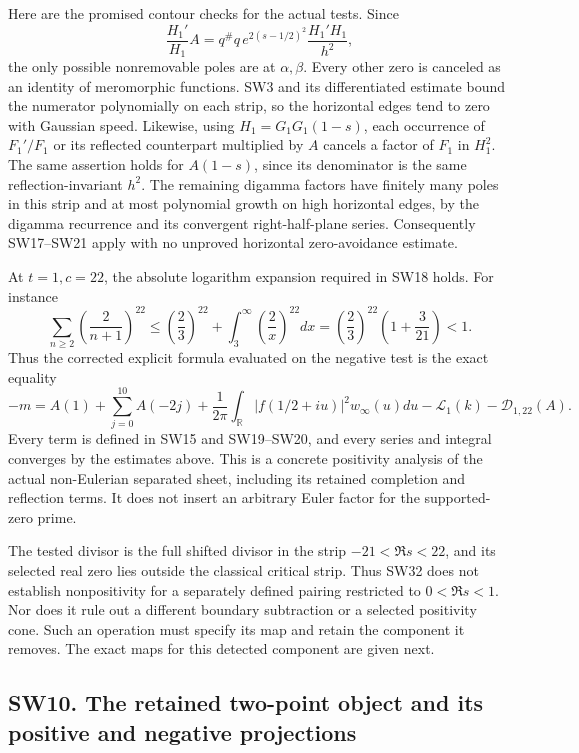 \documentclass[
  10pt,
  a4paper,
]{article}
\begin{document}
Here are the promised contour checks for the actual tests. Since \[
\frac{H_1'}{H_1}A
=q^\#q\,e^{2(s-1/2)^2}\frac{H_1'H_1}{h^2},
\tag{SW34}
\] the only possible nonremovable poles are at \(\alpha,\beta\). Every
other zero is canceled as an identity of meromorphic functions. SW3 and
its differentiated estimate bound the numerator polynomially on each
strip, so the horizontal edges tend to zero with Gaussian speed.
Likewise, using \(H_1=G_1G_1(1-s)\), each occurrence of \(F_1'/F_1\) or
its reflected counterpart multiplied by \(A\) cancels a factor of
\(F_1\) in \(H_1^2\). The same assertion holds for \(A(1-s)\), since its
denominator is the same reflection-invariant \(h^2\). The remaining
digamma factors have finitely many poles in this strip and at most
polynomial growth on high horizontal edges, by the digamma recurrence
and its convergent right-half-plane series. Consequently SW17--SW21
apply with no unproved horizontal zero-avoidance estimate.

At \(t=1,c=22\), the absolute logarithm expansion required in SW18
holds. For instance \[
\sum_{n\ge2}\left(\frac2{n+1}\right)^{22}
\le\left(\frac23\right)^{22}
+\int_3^\infty\left(\frac2x\right)^{22}dx
=\left(\frac23\right)^{22}\left(1+\frac3{21}\right)<1.
\tag{SW35}
\] Thus the corrected explicit formula evaluated on the negative test is
the exact equality \[
\boxed{
-m=A(1)+\sum_{j=0}^{10}A(-2j)
+\frac1{2\pi}\int_{\mathbb R}|f(1/2+iu)|^2w_\infty(u)du
-\mathcal L_1(k)-\mathcal D_{1,22}(A).
}
\tag{SW36}
\] Every term is defined in SW15 and SW19--SW20, and every series and
integral converges by the estimates above. This is a concrete positivity
analysis of the actual non-Eulerian separated sheet, including its
retained completion and reflection terms. It does not insert an
arbitrary Euler factor for the supported-zero prime.

The tested divisor is the full shifted divisor in the strip
\(-21<\Re s<22\), and its selected real zero lies outside the classical
critical strip. Thus SW32 does not establish nonpositivity for a
separately defined pairing restricted to \(0<\Re s<1\). Nor does it rule
out a different boundary subtraction or a selected positivity cone. Such
an operation must specify its map and retain the component it removes.
The exact maps for this detected component are given next.

\subsection{SW10. The retained two-point object and its positive and
negative
projections}\label{sw10.-the-retained-two-point-object-and-its-positive-and-negative-projections}
\end{document}
